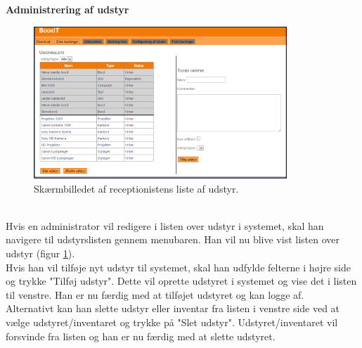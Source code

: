 \textbf{Administrering af udstyr}
\begin{figure}[h!]
  \centering
    \includegraphics[width=0.85\textwidth]{Appendix/GUI-Prototype/DigitalMockup/UdstyrsListe}
  \caption{Skærmbilledet af receptionistens liste af udstyr.}
\label{Design_G_Development_UdstyrsListe_Final}
\end{figure} 
\\Hvis en administrator vil redigere i listen over udstyr i systemet, skal han navigere til udstyrslisten gennem menubaren. Han vil nu blive vist listen over udstyr (figur \ref{Design_G_Development_UdstyrsListe_Final}). 
\\Hvis han vil tilføje nyt udstyr til systemet, skal han udfylde felterne i højre side og trykke "Tilføj udstyr". Dette vil oprette udstyret i systemet og vise det i listen til venstre. Han er nu færdig med at tilføjet udstyret og kan logge af.
\\Alternativt kan han slette udstyr eller inventar fra listen i venstre side ved at vælge udstyret/inventaret og trykke på "Slet udstyr". Udstyret/inventaret vil forsvinde fra listen og han er nu færdig med at slette udstyret.

